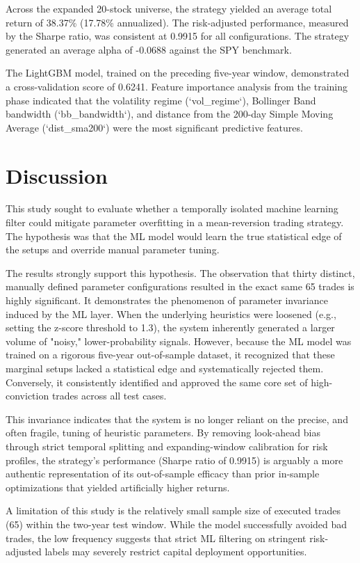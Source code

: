 \documentclass[12pt]{article}
\begin{document}
Across the expanded 20-stock universe, the strategy yielded an average total return of 38.37\% (17.78\% annualized). The risk-adjusted performance, measured by the Sharpe ratio, was consistent at 0.9915 for all configurations. The strategy generated an average alpha of -0.0688 against the SPY benchmark. 

The LightGBM model, trained on the preceding five-year window, demonstrated a cross-validation score of 0.6241. Feature importance analysis from the training phase indicated that the volatility regime (`vol_regime`), Bollinger Band bandwidth (`bb_bandwidth`), and distance from the 200-day Simple Moving Average (`dist_sma200`) were the most significant predictive features. 

\section*{Discussion}

This study sought to evaluate whether a temporally isolated machine learning filter could mitigate parameter overfitting in a mean-reversion trading strategy. The hypothesis was that the ML model would learn the true statistical edge of the setups and override manual parameter tuning.

The results strongly support this hypothesis. The observation that thirty distinct, manually defined parameter configurations resulted in the exact same 65 trades is highly significant. It demonstrates the phenomenon of parameter invariance induced by the ML layer. When the underlying heuristics were loosened (e.g., setting the z-score threshold to 1.3), the system inherently generated a larger volume of "noisy," lower-probability signals. However, because the ML model was trained on a rigorous five-year out-of-sample dataset, it recognized that these marginal setups lacked a statistical edge and systematically rejected them. Conversely, it consistently identified and approved the same core set of high-conviction trades across all test cases.

This invariance indicates that the system is no longer reliant on the precise, and often fragile, tuning of heuristic parameters. By removing look-ahead bias through strict temporal splitting and expanding-window calibration for risk profiles, the strategy's performance (Sharpe ratio of 0.9915) is arguably a more authentic representation of its out-of-sample efficacy than prior in-sample optimizations that yielded artificially higher returns.

A limitation of this study is the relatively small sample size of executed trades (65) within the two-year test window. While the model successfully avoided bad trades, the low frequency suggests that strict ML filtering on stringent risk-adjusted labels may severely restrict capital deployment opportunities.
\end{document}
